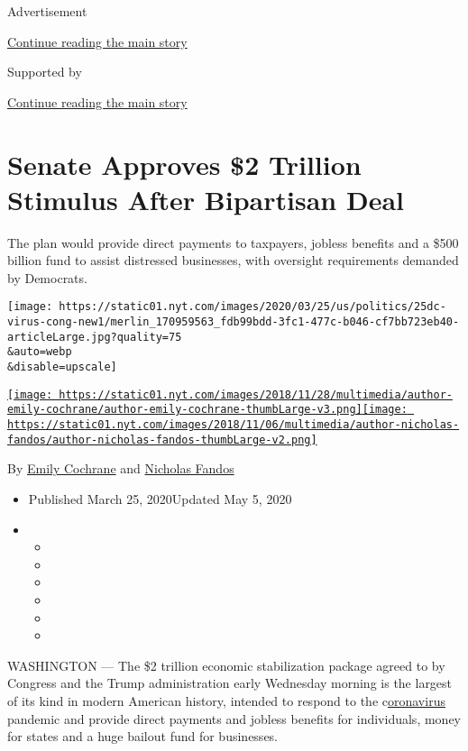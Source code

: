 Advertisement

\protect\hyperlink{after-top}{Continue reading the main story}

Supported by

\protect\hyperlink{after-sponsor}{Continue reading the main story}

\hypertarget{senate-approves-2-trillion-stimulus-after-bipartisan-deal}{%
\section{Senate Approves \$2 Trillion Stimulus After Bipartisan
Deal}\label{senate-approves-2-trillion-stimulus-after-bipartisan-deal}}

The plan would provide direct payments to taxpayers, jobless benefits
and a \$500 billion fund to assist distressed businesses, with oversight
requirements demanded by Democrats.

\texttt{[image: https://static01.nyt.com/images/2020/03/25/us/politics/25dc-virus-cong-new1/merlin\_170959563\_fdb99bdd-3fc1-477c-b046-cf7bb723eb40-articleLarge.jpg?quality=75\\\&auto=webp\\\&disable=upscale]}

\href{https://www.nytimes.com/by/emily-cochrane}{\texttt{[image: https://static01.nyt.com/images/2018/11/28/multimedia/author-emily-cochrane/author-emily-cochrane-thumbLarge-v3.png]}}\href{https://www.nytimes.com/by/nicholas-fandos}{\texttt{[image: https://static01.nyt.com/images/2018/11/06/multimedia/author-nicholas-fandos/author-nicholas-fandos-thumbLarge-v2.png]}}

By \href{https://www.nytimes.com/by/emily-cochrane}{Emily Cochrane} and
\href{https://www.nytimes.com/by/nicholas-fandos}{Nicholas Fandos}

\begin{itemize}
\item
  Published March 25, 2020Updated May 5, 2020
\item
  \begin{itemize}
  \item
  \item
  \item
  \item
  \item
  \item
  \end{itemize}
\end{itemize}

WASHINGTON --- The \$2 trillion economic stabilization package agreed to
by Congress and the Trump administration early Wednesday morning is the
largest of its kind in modern American history, intended to respond to
the
c\href{https://www.nytimes.com/article/where-is-my-stimulus-payment.html}{oronavirus}
pandemic and provide direct payments and jobless benefits for
individuals, money for states and a huge bailout fund for businesses.

